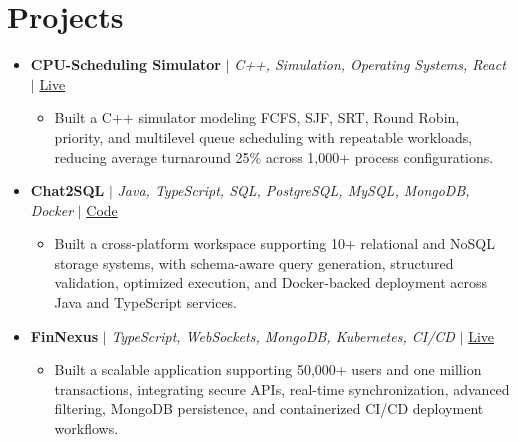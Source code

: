 \documentclass[letterpaper,10pt]{article}
\newcommand{\resumeItem}[1]{\item\small{{#1 \vspace{-2pt}}}}
\newcommand{\resumeProjectHeading}[1]{\item \small #1 \vspace{-2pt}}
\newcommand{\resumeSubHeadingListStart}{\begin{itemize}[leftmargin=0.0in,label={}]}
\newcommand{\resumeSubHeadingListEnd}{\end{itemize}}
\newcommand{\resumeProjItemListStart}{\begin{itemize}[leftmargin=0.15in,label=\textbullet,itemsep=0pt,topsep=0pt,parsep=0pt,partopsep=0pt]}
\newcommand{\resumeProjItemListEnd}{\end{itemize}\vspace{1pt}}
\begin{document}
\section{Projects}
\resumeSubHeadingListStart
  \resumeProjectHeading{\textbf{CPU-Scheduling Simulator} $|$ \emph{C++, Simulation, Operating Systems, React} $|$ \href{https://cpu-scheduler-amber.vercel.app/}{Live}}
  \resumeProjItemListStart
    \resumeItem{Built a C++ simulator modeling FCFS, SJF, SRT, Round Robin, priority, and multilevel queue scheduling with repeatable workloads, reducing average turnaround 25\% across 1,000+ process configurations.}
  \resumeProjItemListEnd
  \resumeProjectHeading{\textbf{Chat2SQL} $|$ \emph{Java, TypeScript, SQL, PostgreSQL, MySQL, MongoDB, Docker} $|$ \href{https://github.com/SAHAJ-BHADJA/Chat2SQL}{Code}}
  \resumeProjItemListStart
    \resumeItem{Built a cross-platform workspace supporting 10+ relational and NoSQL storage systems, with schema-aware query generation, structured validation, optimized execution, and Docker-backed deployment across Java and TypeScript services.}
  \resumeProjItemListEnd
  \resumeProjectHeading{\textbf{FinNexus} $|$ \emph{TypeScript, WebSockets, MongoDB, Kubernetes, CI/CD} $|$ \href{https://fin-nexus.vercel.app/}{Live}}
  \resumeProjItemListStart
    \resumeItem{Built a scalable application supporting 50,000+ users and one million transactions, integrating secure APIs, real-time synchronization, advanced filtering, MongoDB persistence, and containerized CI/CD deployment workflows.}
  \resumeProjItemListEnd
\resumeSubHeadingListEnd
\end{document}
